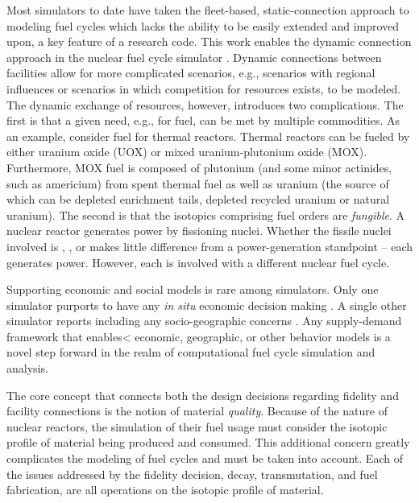 Most simulators to date have taken the fleet-based, static-connection approach
to modeling fuel cycles which lacks the ability to be easily extended and
improved upon, a key feature of a research code. This work enables the dynamic
connection approach in the \Cyclus nuclear fuel cycle simulator . Dynamic
connections between facilities allow for more complicated scenarios, e.g.,
scenarios with regional influences or scenarios in which competition for
resources exists, to be modeled. The dynamic exchange of resources, however,
introduces two complications. The first is that a given need, e.g., for fuel,
can be met by multiple commodities. As an example, consider fuel for thermal
reactors. Thermal reactors can be fueled by either uranium oxide (UOX) or mixed
uranium-plutonium oxide (MOX). Furthermore, MOX fuel is composed of plutonium
(and some minor actinides, such as americium) from spent thermal fuel as well as
uranium (the source of which can be depleted enrichment tails, depleted recycled
uranium or natural uranium). The second is that the isotopics comprising fuel
orders are \textit{fungible}. A nuclear reactor generates power by fissioning
nuclei. Whether the fissile nuclei involved is , , or
 makes little difference from a power-generation standpoint -- each
generates power. However, each is involved with a different nuclear fuel cycle.

Supporting economic and social models is rare among simulators. Only one
simulator purports to have any \textit{in situ} economic decision making
\cite{van_den_durpel_daness_2009}. A single other simulator reports including
any socio-geographic concerns \cite{andrianova_desae_2008}. Any supply-demand
framework that enables< economic, geographic, or other behavior models is a
novel step forward in the realm of computational fuel cycle simulation and
analysis.

The core concept that connects both the design decisions regarding fidelity and
facility connections is the notion of material \textit{quality}. Because of the
nature of nuclear reactors, the simulation of their fuel usage must consider the
isotopic profile of material being produced and consumed. This additional
concern greatly complicates the modeling of fuel cycles and must be taken into
account. Each of the issues addressed by the fidelity decision, decay,
transmutation, and fuel fabrication, are all operations on the isotopic profile
of material. 
